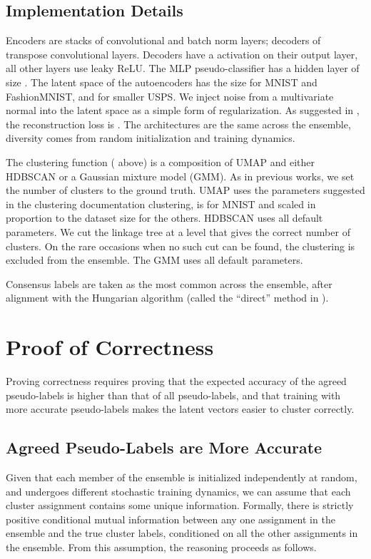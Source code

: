 \documentclass[runningheads]{llncs}
\begin{document}
\subsection{Implementation Details}
Encoders are stacks of convolutional and batch norm layers; decoders of transpose convolutional layers. Decoders have a  activation on their output layer, all other layers use leaky ReLU. The MLP pseudo-classifier has a hidden layer of size . The latent space of the autoencoders has the size  for MNIST and FashionMNIST, and  for smaller USPS. We inject noise from a multivariate normal into the latent space as a simple form of regularization. As suggested in \cite{zhao2015loss}, the reconstruction loss is . The architectures are the same across the ensemble, diversity comes from random initialization and training dynamics.

The clustering function ( above) is a composition of UMAP \cite{mcinnes2018umap} and either HDBSCAN \cite{mcinnes2017hdbscan} or a Gaussian mixture model (GMM). As in previous works, we set the number of clusters to the ground truth. UMAP uses the parameters suggested in the clustering documentation clustering,  is  for MNIST and scaled in proportion to the dataset size for the others. HDBSCAN uses all default parameters. We cut the linkage tree at a level that gives the correct number of clusters. On the rare occasions when no such cut can be found, the clustering is excluded from the ensemble. The GMM uses all default parameters.

Consensus labels are taken as the most common across the ensemble, after alignment with the Hungarian algorithm (called the ``direct'' method in \cite{boongoen2018cluster}). \section{Proof of Correctness} \label{sec:proof}
Proving correctness requires proving that the expected accuracy of the agreed pseudo-labels is higher than that of all pseudo-labels, and that training with more accurate pseudo-labels makes the latent vectors easier to cluster correctly.

\subsection{Agreed Pseudo-Labels are More Accurate}
Given that each member of the ensemble is initialized independently at random, and undergoes different stochastic training dynamics, we can assume that each cluster assignment contains some unique information. Formally, there is strictly positive conditional mutual information between any one assignment in the ensemble and the true cluster labels, conditioned on all the other assignments in the ensemble. From this assumption, the reasoning proceeds as follows.
\end{document}
